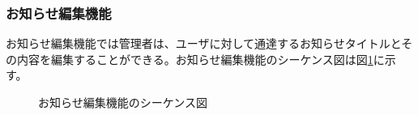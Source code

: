 \documentclass[a4j]{jarticle}
\begin{document}
  \subsubsection{お知らせ編集機能}
  お知らせ編集機能では管理者は、ユーザに対して通達するお知らせタイトルとその内容を編集することができる。お知らせ編集機能のシーケンス図は図\ref{fig:admin_news.png}に示す。
  \begin{figure}[H]
    \centering
    \caption{お知らせ編集機能のシーケンス図}
    \label{fig:admin_news.png}
  \end{figure}
\end{document}

